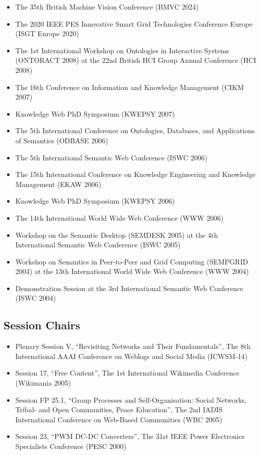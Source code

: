 \documentclass[10pt,a4paper]{res} %
\begin{document}
\begin{resume}
\begin{itemize} \itemsep -2pt
\item The 35th British Machine Vision Conference (BMVC 2024)
\item The 2020 IEEE PES Innovative Smart Grid Technologies Conference Europe (ISGT Europe 2020)
\item The 1st International Workshop on Ontologies in Interactive Systems (ONTORACT 2008) at the 22nd British HCI Group Annual Conference (HCI 2008)
\item The 16th Conference on Information and Knowledge Management (CIKM 2007)
\item Knowledge Web PhD Symposium (KWEPSY 2007)
\item The 5th International Conference on Ontologies, Databases, and Applications of Semantics (ODBASE 2006)
\item The 5th International Semantic Web Conference (ISWC 2006)
\item The 15th International Conference on Knowledge Engineering and Knowledge Management (EKAW 2006)
\item Knowledge Web PhD Symposium (KWEPSY 2006)
\item The 14th International World Wide Web Conference (WWW 2006)
\item Workshop on the Semantic Desktop (SEMDESK 2005) at the 4th International Semantic Web Conference (ISWC 2005)
\item Workshop on Semantics in Peer-to-Peer and Grid Computing (SEMPGRID 2004) at the 13th International World Wide Web Conference (WWW 2004)
\item Demonstration Session at the 3rd International Semantic Web Conference (ISWC 2004)
\end{itemize}

\subsection*{Session Chairs}

\begin{itemize} \itemsep -2pt
\item Plenary Session V, ``Revisiting Networks and Their Fundamentals'', The 8th International AAAI Conference on Weblogs and Social Media (ICWSM-14)
\item Session 17, ``Free Content'', The 1st International Wikimedia Conference (Wikimania 2005)
\item Session FP 25.1, ``Group Processes and Self-Organisation: Social Networks, Tribal- and Open Communities, Peace Education'', The 2nd IADIS International Conference on Web-Based Communities (WBC 2005)
\item Session 23, ``PWM DC-DC Converters'', The 31st IEEE Power Electronics Specialists Conference (PESC 2000)
\end{itemize}


\end{resume}
\end{document}
